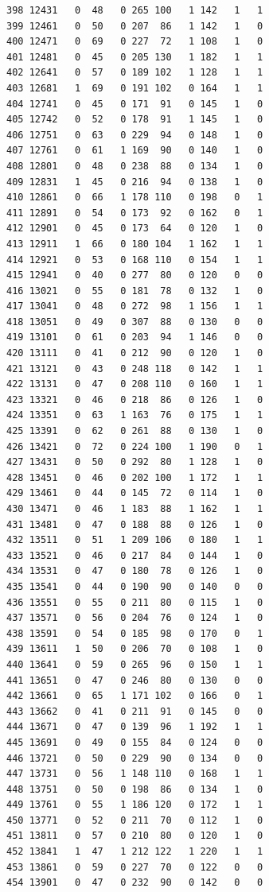 \documentclass[
  letterpaper,
]{scrbook}
\begin{document}
\begin{verbatim}
398 12431   0  48   0 265 100   1 142   1   1
399 12461   0  50   0 207  86   1 142   1   0
400 12471   0  69   0 227  72   1 108   1   0
401 12481   0  45   0 205 130   1 182   1   1
402 12641   0  57   0 189 102   1 128   1   1
403 12681   1  69   0 191 102   0 164   1   1
404 12741   0  45   0 171  91   0 145   1   0
405 12742   0  52   0 178  91   1 145   1   0
406 12751   0  63   0 229  94   0 148   1   0
407 12761   0  61   1 169  90   0 140   1   0
408 12801   0  48   0 238  88   0 134   1   0
409 12831   1  45   0 216  94   0 138   1   0
410 12861   0  66   1 178 110   0 198   0   1
411 12891   0  54   0 173  92   0 162   0   1
412 12901   0  45   0 173  64   0 120   1   0
413 12911   1  66   0 180 104   1 162   1   1
414 12921   0  53   0 168 110   0 154   1   1
415 12941   0  40   0 277  80   0 120   0   0
416 13021   0  55   0 181  78   0 132   1   0
417 13041   0  48   0 272  98   1 156   1   1
418 13051   0  49   0 307  88   0 130   0   0
419 13101   0  61   0 203  94   1 146   0   0
420 13111   0  41   0 212  90   0 120   1   0
421 13121   0  43   0 248 118   0 142   1   1
422 13131   0  47   0 208 110   0 160   1   1
423 13321   0  46   0 218  86   0 126   1   0
424 13351   0  63   1 163  76   0 175   1   1
425 13391   0  62   0 261  88   0 130   1   0
426 13421   0  72   0 224 100   1 190   0   1
427 13431   0  50   0 292  80   1 128   1   0
428 13451   0  46   0 202 100   1 172   1   1
429 13461   0  44   0 145  72   0 114   1   0
430 13471   0  46   1 183  88   1 162   1   1
431 13481   0  47   0 188  88   0 126   1   0
432 13511   0  51   1 209 106   0 180   1   1
433 13521   0  46   0 217  84   0 144   1   0
434 13531   0  47   0 180  78   0 126   1   0
435 13541   0  44   0 190  90   0 140   0   0
436 13551   0  55   0 211  80   0 115   1   0
437 13571   0  56   0 204  76   0 124   1   0
438 13591   0  54   0 185  98   0 170   0   1
439 13611   1  50   0 206  70   0 108   1   0
440 13641   0  59   0 265  96   0 150   1   1
441 13651   0  47   0 246  80   0 130   0   0
442 13661   0  65   1 171 102   0 166   0   1
443 13662   0  41   0 211  91   0 145   0   0
444 13671   0  47   0 139  96   1 192   1   1
445 13691   0  49   0 155  84   0 124   0   0
446 13721   0  50   0 229  90   0 134   0   0
447 13731   0  56   1 148 110   0 168   1   1
448 13751   0  50   0 198  86   0 134   1   0
449 13761   0  55   1 186 120   0 172   1   1
450 13771   0  52   0 211  70   0 112   1   0
451 13811   0  57   0 210  80   0 120   1   0
452 13841   1  47   1 212 122   1 220   1   1
453 13861   0  59   0 227  70   0 122   0   0
454 13901   0  47   0 232  90   0 142   0   0

\end{verbatim}
\end{document}
